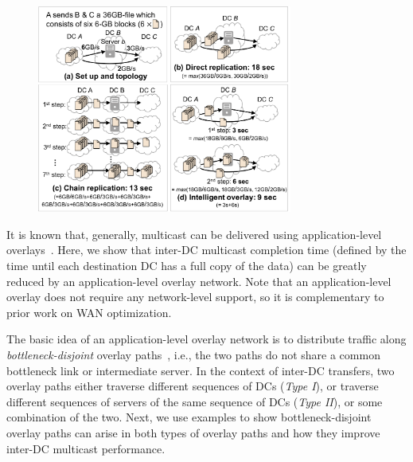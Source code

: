 \begin{figure}[t]
\centering
\includegraphics[width=84mm]{images/example-2.pdf}
\vspace{-0.4cm}
\label{fig:case:example}
\vspace{-0.4cm}
\end{figure}

It is known that, generally, multicast can be delivered using application-level 
overlays~\cite{chu2000case}. Here, we show that inter-DC multicast
completion time (defined by the time until each destination DC has
a full copy of the data) can be greatly reduced by an 
application-level overlay network. Note that an application-level 
overlay does not require any network-level support, so it is 
complementary to prior work on WAN optimization.

The basic idea of an application-level overlay network is to 
distribute traffic along {\em bottleneck-disjoint} overlay 
paths~\cite{datta19951}, i.e., the two paths do not share a common
bottleneck link or intermediate server.
In the context of inter-DC transfers, two overlay paths either 
traverse different sequences of DCs ({\em Type I}), or
traverse different sequences of servers of the same sequence of 
DCs ({\em Type II}), or some combination of the two. 
Next, we use examples to show bottleneck-disjoint overlay paths can 
arise in both types of overlay paths and how they improve inter-DC 
multicast performance.

